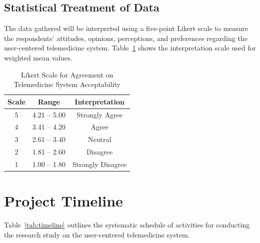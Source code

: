 \documentclass[12pt]{report}
\begin{document}
\subsection*{Statistical Treatment of Data}

The data gathered will be interpreted using a five-point Likert scale to measure
the respondents' attitudes, opinions, perceptions, and preferences regarding the
user-centered telemedicine system. Table~\ref{tab:likert} shows the
interpretation scale used for weighted mean values.

\begin{table}[htbp]
  \centering
  \caption{Likert Scale for Agreement on Telemedicine System Acceptability}
  \label{tab:likert}
  \begin{tabular}{ccc}
    \toprule
    \textbf{Scale} & \textbf{Range} & \textbf{Interpretation} \\
    \midrule
    5 & 4.21 -- 5.00 & Strongly Agree   \\
    4 & 3.41 -- 4.20 & Agree            \\
    3 & 2.61 -- 3.40 & Neutral          \\
    2 & 1.81 -- 2.60 & Disagree         \\
    1 & 1.00 -- 1.80 & Strongly Disagree \\
    \bottomrule
  \end{tabular}
\end{table}

\section*{Project Timeline}

Table~\ref{tab:timeline} outlines the systematic schedule of activities for
conducting the research study on the user-centered telemedicine system.
\end{document}
